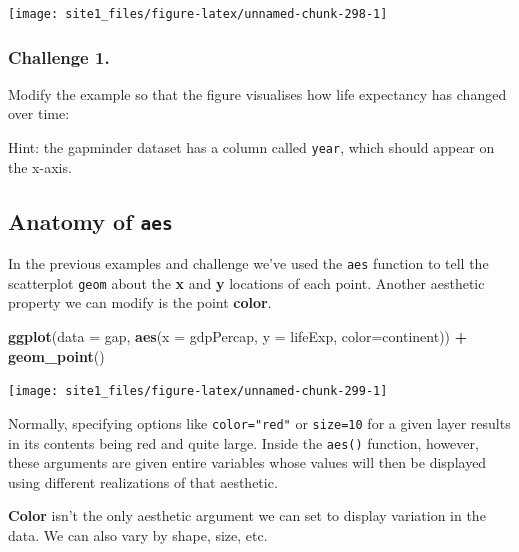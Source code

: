 \documentclass[]{book}
\newenvironment{Shaded}{\begin{snugshade}}{\end{snugshade}}
\newcommand{\KeywordTok}[1]{\textcolor[rgb]{0.13,0.29,0.53}{\textbf{#1}}}
\newcommand{\DataTypeTok}[1]{\textcolor[rgb]{0.13,0.29,0.53}{#1}}
\newcommand{\StringTok}[1]{\textcolor[rgb]{0.31,0.60,0.02}{#1}}
\newcommand{\OperatorTok}[1]{\textcolor[rgb]{0.81,0.36,0.00}{\textbf{#1}}}
\newcommand{\NormalTok}[1]{#1}
\begin{document}
\begin{center}\texttt{[image: site1\_files/figure-latex/unnamed-chunk-298-1]} \end{center}

\subsubsection*{Challenge 1.}\label{challenge-1.-8}

Modify the example so that the figure visualises how life expectancy has
changed over time:

Hint: the gapminder dataset has a column called \texttt{year}, which
should appear on the x-axis.

\subsection{\texorpdfstring{Anatomy of
\texttt{aes}}{Anatomy of aes}}\label{anatomy-of-aes}

In the previous examples and challenge we've used the \texttt{aes}
function to tell the scatterplot \texttt{geom} about the \textbf{x} and
\textbf{y} locations of each point. Another aesthetic property we can
modify is the point \textbf{color}.

\begin{Shaded}
\begin{Highlighting}[]
\KeywordTok{ggplot}\NormalTok{(}\DataTypeTok{data =}\NormalTok{ gap, }\KeywordTok{aes}\NormalTok{(}\DataTypeTok{x =}\NormalTok{ gdpPercap, }\DataTypeTok{y =}\NormalTok{ lifeExp, }\DataTypeTok{color=}\NormalTok{continent)) }\OperatorTok{+}\StringTok{ }
\StringTok{  }\KeywordTok{geom_point}\NormalTok{()}
\end{Highlighting}
\end{Shaded}

\begin{center}\texttt{[image: site1\_files/figure-latex/unnamed-chunk-299-1]} \end{center}

Normally, specifying options like \texttt{color="red"} or
\texttt{size=10} for a given layer results in its contents being red and
quite large. Inside the \texttt{aes()} function, however, these
arguments are given entire variables whose values will then be displayed
using different realizations of that aesthetic.

\textbf{Color} isn't the only aesthetic argument we can set to display
variation in the data. We can also vary by shape, size, etc.
\end{document}
